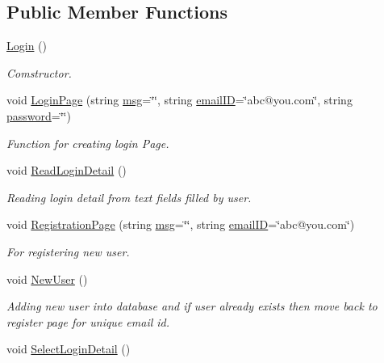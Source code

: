\subsection*{Public Member Functions}
\begin{DoxyCompactItemize}
\item 
\hyperlink{classLogin_a4847f3e07e43b540d3339392346f87ff}{Login} ()
\begin{DoxyCompactList}\small\item\em Comstructor. \end{DoxyCompactList}\item 
void \hyperlink{classLogin_a2b2b36f506bcb5e7179b0b3afe164ace}{Login\-Page} (string \hyperlink{classInputDetail_a1abb16cd695678c3fa05e3c812823fee}{msg}=\char`\"{}\char`\"{}, string \hyperlink{classLogin_abea56d6d6403f1e627294f222dd77310}{email\-I\-D}=\char`\"{}abc@you.\-com\char`\"{}, string \hyperlink{classLogin_a39f7fd03b2b27c927c657ee73e7fcbbc}{password}=\char`\"{}\char`\"{})
\begin{DoxyCompactList}\small\item\em Function for creating login Page. \end{DoxyCompactList}\item 
void \hyperlink{classLogin_ab5bc65de431f277f15a3b423ad915808}{Read\-Login\-Detail} ()
\begin{DoxyCompactList}\small\item\em Reading login detail from text fields filled by user. \end{DoxyCompactList}\item 
void \hyperlink{classLogin_a3f4e5e4087c007e8e605849778881b39}{Registration\-Page} (string \hyperlink{classInputDetail_a1abb16cd695678c3fa05e3c812823fee}{msg}=\char`\"{}\char`\"{}, string \hyperlink{classLogin_abea56d6d6403f1e627294f222dd77310}{email\-I\-D}=\char`\"{}abc@you.\-com\char`\"{})
\begin{DoxyCompactList}\small\item\em For registering new user. \end{DoxyCompactList}\item 
void \hyperlink{classLogin_ae4f139afcb706f09b337befd123d5e18}{New\-User} ()
\begin{DoxyCompactList}\small\item\em Adding new user into database and if user already exists then move back to register page for unique email id. \end{DoxyCompactList}\item 
void \hyperlink{classLogin_ad127628ca09987d733477f90b828ad1e}{Select\-Login\-Detail} ()

\end{DoxyCompactItemize}
